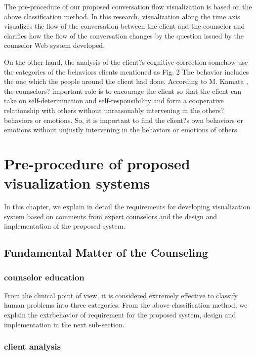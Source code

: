 \documentclass[review]{elsarticle}
\begin{document}
The pre-procedure of our proposed conversation flow visualization is based on the above classification method. In this research, visualization along the time axis visualizes the flow of the conversation between the client and the counselor and clarifies how the flow of the conversation changes by the question issued by the counselor Web system developed.

On the other hand, the analysis of the client?s cognitive correction somehow use the categories of the behaviors clients mentioned as Fig. 2 The behavior includes the one which the people around the client had done. According to M. Kamata \cite{kamata2002}, the counselors? important role is to encourage the client so that the client can take on self-determination and self-responsibility and form a cooperative relationship with others without unreasonably intervening in the others? behaviors or emotions. So, it is important to find the client?s own behaviors or emotions without unjustly intervening in the behaviors or emotions of others.

\section{Pre-procedure of proposed visualization systems}

  In this chapter, we explain in detail the requirements for developing visualization system based on comments from expert counselors and the design and implementation of the proposed system. 

\subsection{Fundamental Matter of the Counseling}

\subsubsection{counselor education}
  
  From the clinical point of view, it is considered extremely effective to classify human problems into three categories. From the above classification method, we explain the extrbehavior of requirement for the proposed system, design and implementation in the next sub-section.

\subsubsection{client analysis}
\end{document}
